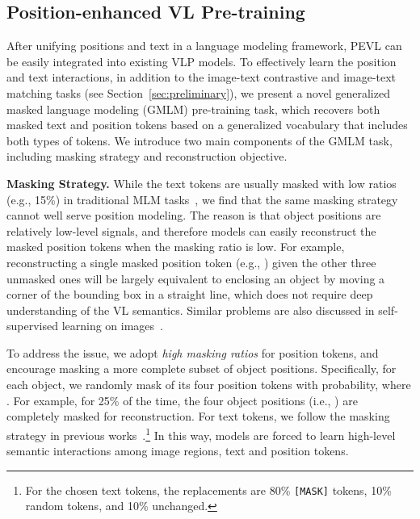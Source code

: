 \documentclass[11pt]{article}
\begin{document}
\subsection{Position-enhanced VL Pre-training}

After unifying positions and text in a language modeling framework, PEVL can be easily integrated into existing VLP models. To effectively learn the position and text interactions, in addition to the image-text contrastive and image-text matching tasks (see Section~\ref{sec:preliminary}), we present a novel generalized masked language modeling (GMLM) pre-training task, which recovers both masked text and position tokens based on a generalized vocabulary  that includes both types of tokens. We introduce two main components of the GMLM task, including masking strategy and reconstruction objective.



\smallskip

\textbf{Masking Strategy.} While the text tokens are usually masked with low ratios (e.g., 15\%) in traditional MLM tasks~\cite{devlin2019bert,li2021align}, we find that the same masking strategy cannot well serve position modeling. The reason is that object positions are relatively low-level signals, and therefore models can easily reconstruct the masked position tokens when the masking ratio is low. For example, reconstructing a single masked position token (e.g., ) given the other three unmasked ones will be largely equivalent to enclosing an object by moving a corner of the bounding box in a straight line, which does not require deep understanding of the VL semantics. Similar problems are also discussed in self-supervised learning on images~\cite{he2021masked}. 

To address the issue, we adopt \textit{high masking ratios} for position tokens, and encourage masking a more complete subset of object positions. Specifically, for each object, we randomly mask  of its four position tokens with  probability, where . For example, for 25\% of the time, the four object positions  (i.e., ) are completely masked for reconstruction. For text tokens, we follow the  masking strategy in previous works~\cite{li2021align}.\footnote{For the chosen text tokens, the replacements are 80\% \texttt{[MASK]} tokens, 10\% random tokens, and 10\% unchanged.} In this way, models are forced to learn high-level semantic interactions among image regions, text and position tokens.
\end{document}
